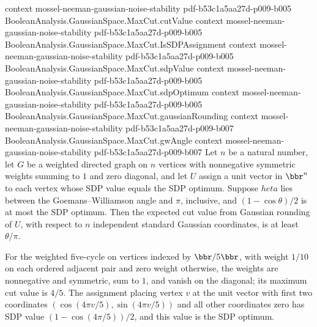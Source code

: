 \begin{theorem}
  {context}
  {mossel-neeman-gaussian-noise-stability}
  {pdf-b53c1a5aa27d-p009-b005}
\proofstep
  {BooleanAnalysis.GaussianSpace.MaxCut.cutValue}
  {context}
  {mossel-neeman-gaussian-noise-stability}
  {pdf-b53c1a5aa27d-p009-b005}
\proofstep
  {BooleanAnalysis.GaussianSpace.MaxCut.IsSDPAssignment}
  {context}
  {mossel-neeman-gaussian-noise-stability}
  {pdf-b53c1a5aa27d-p009-b005}
\proofstep
  {BooleanAnalysis.GaussianSpace.MaxCut.sdpValue}
  {context}
  {mossel-neeman-gaussian-noise-stability}
  {pdf-b53c1a5aa27d-p009-b005}
\proofstep
  {BooleanAnalysis.GaussianSpace.MaxCut.sdpOptimum}
  {context}
  {mossel-neeman-gaussian-noise-stability}
  {pdf-b53c1a5aa27d-p009-b005}
\proofstep
  {BooleanAnalysis.GaussianSpace.MaxCut.gaussianRounding}
  {context}
  {mossel-neeman-gaussian-noise-stability}
  {pdf-b53c1a5aa27d-p009-b007}
\proofstep
  {BooleanAnalysis.GaussianSpace.MaxCut.gwAngle}
  {context}
  {mossel-neeman-gaussian-noise-stability}
  {pdf-b53c1a5aa27d-p009-b007}
Let $n$ be a natural number, let $G$ be a weighted directed graph on $n$ vertices with
nonnegative symmetric weights summing to $1$ and zero diagonal, and let $U$ assign a
unit vector in $\bbr^n$ to each vertex whose SDP value equals the SDP optimum. Suppose
$	heta$ lies between the Goemans–Williamson angle and $\pi$, inclusive, and
$(1-\cos\theta)/2$ is at most the SDP optimum. Then the expected cut value from
Gaussian rounding of $U$, with respect to $n$ independent standard Gaussian coordinates,
is at least $\theta/\pi$.
\end{theorem}

\begin{theorem}
\label{BooleanAnalysis.GaussianSpace.MaxCut.fiveCycle_optima}
\leanok
{}
For the weighted five-cycle on vertices indexed by $\bbr/5\bbr$, with weight $1/10$ on
each ordered adjacent pair and zero weight otherwise, the weights are nonnegative and
symmetric, sum to $1$, and vanish on the diagonal; its maximum cut value is $4/5$. The
assignment placing vertex $v$ at the unit vector with first two coordinates
$(\cos(4\pi v/5),\sin(4\pi v/5))$ and all other coordinates zero has SDP value
$(1-\cos(4\pi/5))/2$, and this value is the SDP optimum.
\end{theorem}

